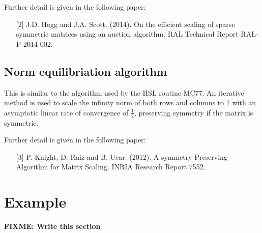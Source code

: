 \noindent
Further detail is given in the following paper:
\begin{itemize}
   \item[{[2]}] J.D. Hogg and J.A. Scott. (2014). On the efficient scaling of sparse symmetric matrices using an auction algorithm. RAL Technical Report RAL-P-2014-002.
\end{itemize}

\subsection{Norm equilibriation algorithm}
This is similar to the algorithm used by the HSL routine MC77.
An iterative method
is used to scale the infinity norm of both rows and columns to 1 with an asymptotic linear rate of convergence of $\frac{1}{2}$, preserving symmetry if the matrix is symmetric.

\noindent
Further detail is given in the following paper:
\begin{itemize}
   \item[{[3]}] P. Knight, D. Ruiz and B. Ucar. (2012). A symmetry Preserving Algorithm for Matrix Scaling. INRIA Research Report 7552.
\end{itemize}



\section{Example} \label{examples}
\textbf{FIXME: Write this section}

%
%
